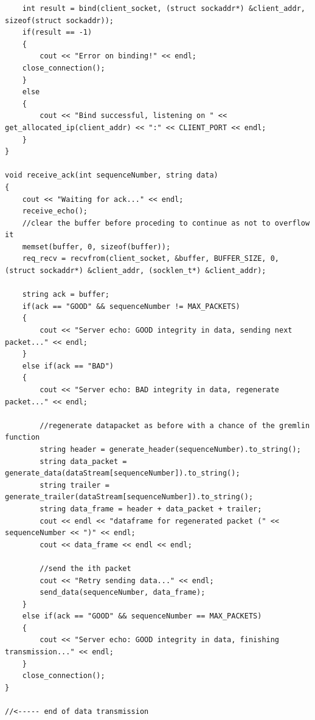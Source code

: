 \documentclass[12pt]{article}
\begin{document}
\begin{lstlisting}
	int result = bind(client_socket, (struct sockaddr*) &client_addr, sizeof(struct sockaddr));
	if(result == -1)
	{
		cout << "Error on binding!" << endl;
  	close_connection();
	}
	else
	{
		cout << "Bind successful, listening on " << get_allocated_ip(client_addr) << ":" << CLIENT_PORT << endl;
	}
}

void receive_ack(int sequenceNumber, string data)
{
	cout << "Waiting for ack..." << endl;
	receive_echo();
	//clear the buffer before proceding to continue as not to overflow it
	memset(buffer, 0, sizeof(buffer));
	req_recv = recvfrom(client_socket, &buffer, BUFFER_SIZE, 0, (struct sockaddr*) &client_addr, (socklen_t*) &client_addr);

	string ack = buffer;	
	if(ack == "GOOD" && sequenceNumber != MAX_PACKETS)
	{				
		cout << "Server echo: GOOD integrity in data, sending next packet..." << endl;
	}
	else if(ack == "BAD")
	{
		cout << "Server echo: BAD integrity in data, regenerate packet..." << endl;
		
		//regenerate datapacket as before with a chance of the gremlin function		
		string header = generate_header(sequenceNumber).to_string();
		string data_packet = generate_data(dataStream[sequenceNumber]).to_string();
		string trailer = generate_trailer(dataStream[sequenceNumber]).to_string();
		string data_frame = header + data_packet + trailer;
		cout << endl << "dataframe for regenerated packet (" << sequenceNumber << ")" << endl;
		cout << data_frame << endl << endl;

		//send the ith packet
		cout << "Retry sending data..." << endl;	
		send_data(sequenceNumber, data_frame);
	}
	else if(ack == "GOOD" && sequenceNumber == MAX_PACKETS)
	{
		cout << "Server echo: GOOD integrity in data, finishing transmission..." << endl;
	}
	close_connection();
}

//<----- end of data transmission 
\end{lstlisting}
\clearpage
\end{document}
